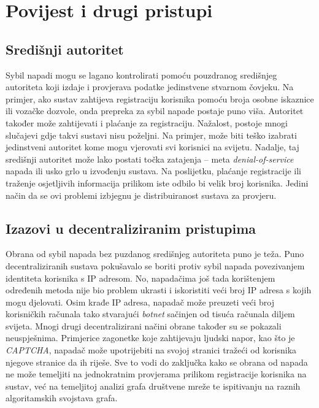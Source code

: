 \documentclass[times, utf8, seminar, numeric]{fer}
\begin{document}

\section{Povijest i drugi pristupi}

\subsection{Središnji autoritet}
Sybil napadi mogu se lagano kontrolirati pomoću pouzdranog središnjeg autoriteta koji izdaje i provjerava podatke jedinstvene stvarnom čovjeku. Na primjer, ako sustav zahtijeva registraciju korisnika pomoću broja osobne iskaznice ili vozačke dozvole, onda prepreka za sybil napade postaje puno viša. Autoritet također može zahtijevati i plaćanje za registraciju. Nažalost, postoje mnogi slučajevi gdje takvi sustavi nisu poželjni. Na primjer, može biti teško izabrati jedinstveni autoritet kome mogu vjerovati svi korisnici na svijetu. Nadalje, taj središnji autoritet može lako postati točka zatajenja  -- meta \textit{denial-of-service} napada ili usko grlo u izvođenju sustava. Na poslijetku, plaćanje registracije ili traženje osjetljivih informacija prilikom iste odbilo bi velik broj korisnika. Jedini način da se ovi problemi izbjegnu je distribuiranost sustava za provjeru. \cite{sybil-guard}

\subsection{Izazovi u decentraliziranim pristupima}
Obrana od sybil napada bez puzdanog središnjeg autoriteta puno je teža. Puno decentraliziranih sustava pokušavalo se boriti protiv sybil napada povezivanjem identiteta korisnika s IP adresom. No, napadačima još tada korištenjem određenih metoda nije bio problem ukrasti i iskoristiti veći broj IP adresa s kojih mogu djelovati. \cite{spammers} Osim krađe IP adresa, napadač može preuzeti veći broj korisničkih računala tako stvarajući \textit{botnet} sačinjen od tisuća računala diljem svijeta. Mnogi drugi decentralizirani načini obrane također su se pokazali neuspješnima. Primjerice zagonetke koje zahtijevaju ljudski napor, kao što je \textit{CAPTCHA}, napadač može upotrijebiti na svojoj stranici tražeći od korisnika njegove stranice da ih riješe. Sve to vodi do zaključka kako se obrana od napada ne može temeljiti na jednokratnim provjerama prilikom registracije korisnika na sustav, već na temeljitoj analizi grafa društvene mreže te ispitivanju na raznih algoritamskih svojstava grafa. \cite{sybil-guard}
\end{document}
